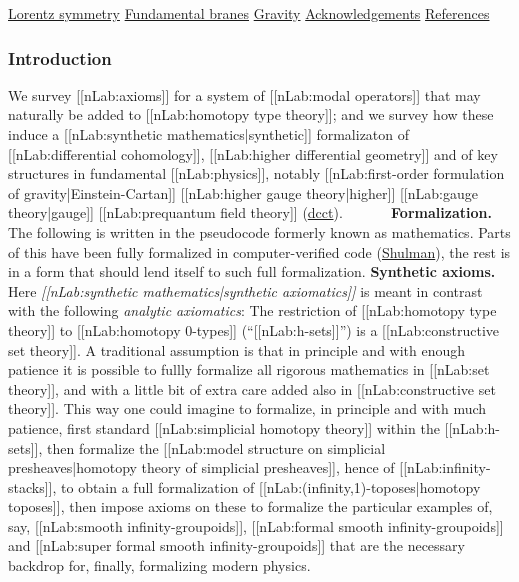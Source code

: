 \documentclass[12pt,titlepage]{article}
\theoremstyle{plain}
\theoremstyle{definition}
\theoremstyle{remark}
\begin{document}
\noindent\hyperlink{lorentz_symmetry}{Lorentz symmetry}\dotfill \pageref*{lorentz_symmetry} \linebreak
\noindent\hyperlink{fundamental_branes}{Fundamental branes}\dotfill \pageref*{fundamental_branes} \linebreak
\noindent\hyperlink{gravity}{Gravity}\dotfill \pageref*{gravity} \linebreak
\noindent\hyperlink{acknowledgements}{Acknowledgements}\dotfill \pageref*{acknowledgements} \linebreak
\noindent\hyperlink{references}{References}\dotfill \pageref*{references} \linebreak
\hypertarget{introduction}{}\subsubsection*{{Introduction}}\label{introduction}
We survey [[nLab:axioms]] for a system of [[nLab:modal operators]] that may naturally be added to [[nLab:homotopy type theory]]; and we survey how these induce a [[nLab:synthetic mathematics|synthetic]] formalizaton of [[nLab:differential cohomology]], [[nLab:higher differential geometry]] and of key structures in fundamental [[nLab:physics]], notably [[nLab:first-order formulation of gravity|Einstein-Cartan]] [[nLab:higher gauge theory|higher]] [[nLab:gauge theory|gauge]] [[nLab:prequantum field theory]] (\hyperlink{dcct}{dcct}).
$\;\;\;\;\;\;\;\;\;\;$ 
\textbf{Formalization.} The following is written in the pseudocode formerly known as mathematics. Parts of this have been fully formalized in computer-verified code (\hyperlink{Shulman}{Shulman}), the rest is in a form that should lend itself to such full formalization.
\textbf{Synthetic axioms.} Here \emph{[[nLab:synthetic mathematics|synthetic axiomatics]]} is meant in contrast with the following \emph{analytic axiomatics}: The restriction of [[nLab:homotopy type theory]] to [[nLab:homotopy 0-types]] (``[[nLab:h-sets]]'') is a [[nLab:constructive set theory]]. A traditional assumption is that in principle and with enough patience it is possible to fullly formalize all rigorous mathematics in [[nLab:set theory]], and with a little bit of extra care added also in [[nLab:constructive set theory]]. This way one could imagine to formalize, in principle and with much patience, first standard [[nLab:simplicial homotopy theory]] within the [[nLab:h-sets]], then formalize the [[nLab:model structure on simplicial presheaves|homotopy theory of simplicial presheaves]], hence of [[nLab:infinity-stacks]], to obtain a full formalization of [[nLab:(infinity,1)-toposes|homotopy toposes]], then impose axioms on these to formalize the particular examples of, say, [[nLab:smooth infinity-groupoids]], [[nLab:formal smooth infinity-groupoids]] and [[nLab:super formal smooth infinity-groupoids]] that are the necessary backdrop for, finally, formalizing modern physics.
\end{document}
